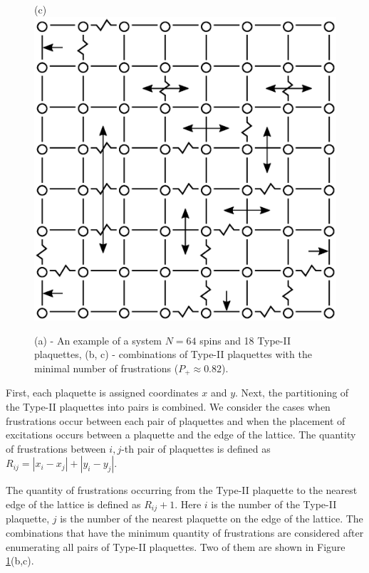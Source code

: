 \documentclass[preprint,12pt]{elsarticle}
\begin{document}
\begin{figure}[H]
\begin{minipage}[h]{0.3\linewidth}
		\end{minipage}
		\hspace{10pt}
		\begin{minipage}[h]{0.3\linewidth}
			\centering(c)
			\includegraphics[width=1\linewidth]{pictures/2PS_cell64_J72_5.eps}
		\end{minipage}
		\caption{(a) - An example of a system $N=64$ spins and 18 Type-II plaquettes, (b, c) - combinations of Type-II plaquettes with the minimal number of frustrations ($P_+\approx0.82$).}
		\label{fig:12PS_cell64_J72_5}
	\end{figure}
	
	
	First, each plaquette is assigned coordinates $x$ and $y$. Next, the partitioning of the Type-II plaquettes into pairs is combined. We consider the cases when frustrations occur between each pair of plaquettes and when the placement of excitations occurs between a plaquette and the edge of the lattice. The quantity of frustrations between $i,j$-th pair of plaquettes is defined as $R_{ij} = \left|x_i-x_j\right|+\left|y_i-y_j\right|$.
	
	The quantity of frustrations occurring from the Type-II plaquette to the nearest edge of the lattice is defined as $R_{ij}+1$. Here $i$ is the number of the Type-II plaquette, $j$ is the number of the nearest plaquette on the edge of the lattice. The combinations that have the minimum quantity of frustrations are considered after enumerating all pairs of Type-II plaquettes. Two of them are shown in Figure \ref{fig:12PS_cell64_J72_5}(b,c).
	
\end{document}
